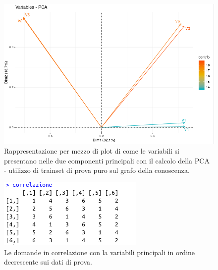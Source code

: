 \begin{figure}[H]
\centering
	\includegraphics[width=0.80\linewidth]{../../PCA/plot/PCA.png}
	\caption{Rappresentazione per mezzo di plot di come le variabili si presentano nelle due componenti principali con il calcolo della PCA - utilizzo di trainset di prova puro sul grafo della conoscenza.}
	\label{Rappresentazione per mezzo di plot di come le variabili si presentano nelle due componenti principali con il calcolo della PCA - utilizzo di trainset di prova puro sul grafo della conoscenza.}
\end{figure}

\begin{figure}[H]
\centering
	\includegraphics[width=0.60\linewidth]{../../PCA/plot/correlazione_base.png}
	\caption{Le domande in correlazione con la variabili principali in ordine decrescente sui dati di prova.}
	\label{Le domande in correlazione con la variabili principali in ordine decrescente sui dati di prova.}
\end{figure}


